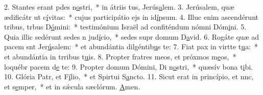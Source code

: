 2. Stantes erant pdes n\uline{o}stri,~* in átriis tus, Jerús\uline{a}lem.
3. Jerúsalem, quæ ædificátr ut c\uline{í}vitas:~* cujus participátio ejs in id\uline{í}psum.
4. Illuc enim ascendérunt tribus, trbus D\uline{ó}mini:~* testimónium Israël ad confiténdum nómni Dóm\uline{i}ni.
5. Quia illic sedérunt sedes n jud\uline{í}cio,~* sedes supr domum D\uline{a}vid.
6. Rogáte quæ ad pacem snt Jer\uline{ú}salem:~* et abundántia dilgéntib\uline{u}s te:
7. Fiat pax in virtte t\uline{u}a:~* et abundántia in trribus t\uline{u}is.
8. Propter fratres meos, et próxmos m\uline{e}os,~* loquébr pacem d\uline{e} te:
9. Propter domum Dómini, Di n\uline{o}stri,~* quæsív bona t\uline{i}bi.
10. Glória Patr, et F\uline{í}lio,~* et Spirtui S\uline{a}ncto.
11. Sicut erat in princípio, et nnc, et s\uline{e}mper,~* et in sǽcula sæclórum. \uline{A}men.
